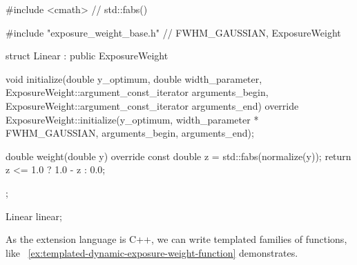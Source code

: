 \begin{exemplar}
  \begin{maxipage}
    \begin{cxxlisting}
#include <cmath>                     // std::fabs()

#include "exposure_weight_base.h"    // FWHM_GAUSSIAN, ExposureWeight

struct Linear : public ExposureWeight {
    void initialize(double y_optimum, double width_parameter,
                    ExposureWeight::argument_const_iterator arguments_begin,
                    ExposureWeight::argument_const_iterator arguments_end)
        override {
        ExposureWeight::initialize(y_optimum,
                                   width_parameter * FWHM_GAUSSIAN,
                                   arguments_begin, arguments_end);
    }

    double weight(double y) override {
        const double z = std::fabs(normalize(y));
        return z <= 1.0 ? 1.0 - z : 0.0;
    }
};

Linear linear;
    \end{cxxlisting}
  \end{maxipage}

  \caption[Simple dynamic exposure weight function]%
          {\label{ex:simple-dynamic-exposure-weight-function}%
            A dynamic exposure weight function that defines a ``roof-top''.  The natural width
            is exactly one, so we override method~ to rescale ,
            passed in as , by multiplying with  to
            get the same width as the predefined Gaussian.}
\end{exemplar}


As the extension language is C++, we can write templated families of functions, like
\exampleName~\ref{ex:templated-dynamic-exposure-weight-function} demonstrates.


